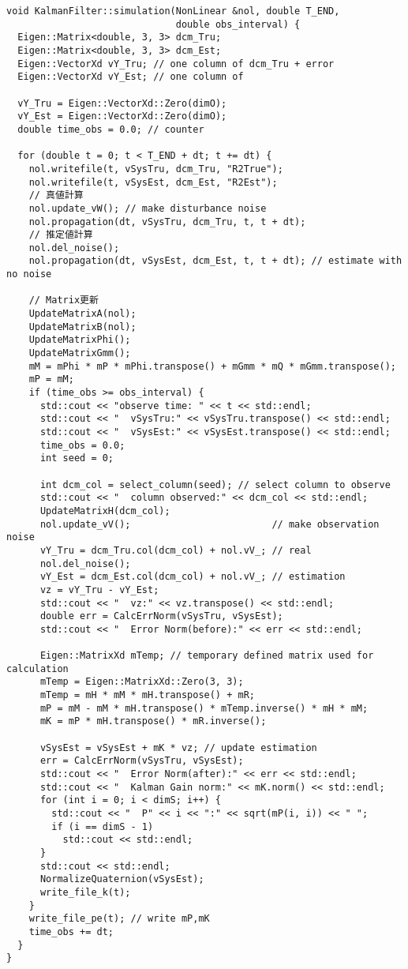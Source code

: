 \documentclass[class=article, crop=false, dvipdfmx, fleqn]{standalone}
\begin{document}
\begin{lstlisting}[caption=kalman$\_$filter.cpp (カルマンフィルタ用クラス(source))]
void KalmanFilter::simulation(NonLinear &nol, double T_END,
                              double obs_interval) {
  Eigen::Matrix<double, 3, 3> dcm_Tru;
  Eigen::Matrix<double, 3, 3> dcm_Est;
  Eigen::VectorXd vY_Tru; // one column of dcm_Tru + error
  Eigen::VectorXd vY_Est; // one column of

  vY_Tru = Eigen::VectorXd::Zero(dimO);
  vY_Est = Eigen::VectorXd::Zero(dimO);
  double time_obs = 0.0; // counter

  for (double t = 0; t < T_END + dt; t += dt) {
    nol.writefile(t, vSysTru, dcm_Tru, "R2True");
    nol.writefile(t, vSysEst, dcm_Est, "R2Est");
    // 真値計算
    nol.update_vW(); // make disturbance noise
    nol.propagation(dt, vSysTru, dcm_Tru, t, t + dt);
    // 推定値計算
    nol.del_noise();
    nol.propagation(dt, vSysEst, dcm_Est, t, t + dt); // estimate with no noise

    // Matrix更新
    UpdateMatrixA(nol);
    UpdateMatrixB(nol);
    UpdateMatrixPhi();
    UpdateMatrixGmm();
    mM = mPhi * mP * mPhi.transpose() + mGmm * mQ * mGmm.transpose();
    mP = mM;
    if (time_obs >= obs_interval) {
      std::cout << "observe time: " << t << std::endl;
      std::cout << "  vSysTru:" << vSysTru.transpose() << std::endl;
      std::cout << "  vSysEst:" << vSysEst.transpose() << std::endl;
      time_obs = 0.0;
      int seed = 0;

      int dcm_col = select_column(seed); // select column to observe
      std::cout << "  column observed:" << dcm_col << std::endl;
      UpdateMatrixH(dcm_col);
      nol.update_vV();                         // make observation noise
      vY_Tru = dcm_Tru.col(dcm_col) + nol.vV_; // real
      nol.del_noise();
      vY_Est = dcm_Est.col(dcm_col) + nol.vV_; // estimation
      vz = vY_Tru - vY_Est;
      std::cout << "  vz:" << vz.transpose() << std::endl;
      double err = CalcErrNorm(vSysTru, vSysEst);
      std::cout << "  Error Norm(before):" << err << std::endl;

      Eigen::MatrixXd mTemp; // temporary defined matrix used for calculation
      mTemp = Eigen::MatrixXd::Zero(3, 3);
      mTemp = mH * mM * mH.transpose() + mR;
      mP = mM - mM * mH.transpose() * mTemp.inverse() * mH * mM;
      mK = mP * mH.transpose() * mR.inverse();

      vSysEst = vSysEst + mK * vz; // update estimation
      err = CalcErrNorm(vSysTru, vSysEst);
      std::cout << "  Error Norm(after):" << err << std::endl;
      std::cout << "  Kalman Gain norm:" << mK.norm() << std::endl;
      for (int i = 0; i < dimS; i++) {
        std::cout << "  P" << i << ":" << sqrt(mP(i, i)) << " ";
        if (i == dimS - 1)
          std::cout << std::endl;
      }
      std::cout << std::endl;
      NormalizeQuaternion(vSysEst);
      write_file_k(t);
    }
    write_file_pe(t); // write mP,mK
    time_obs += dt;
  }
}


\end{lstlisting}
\end{document}
